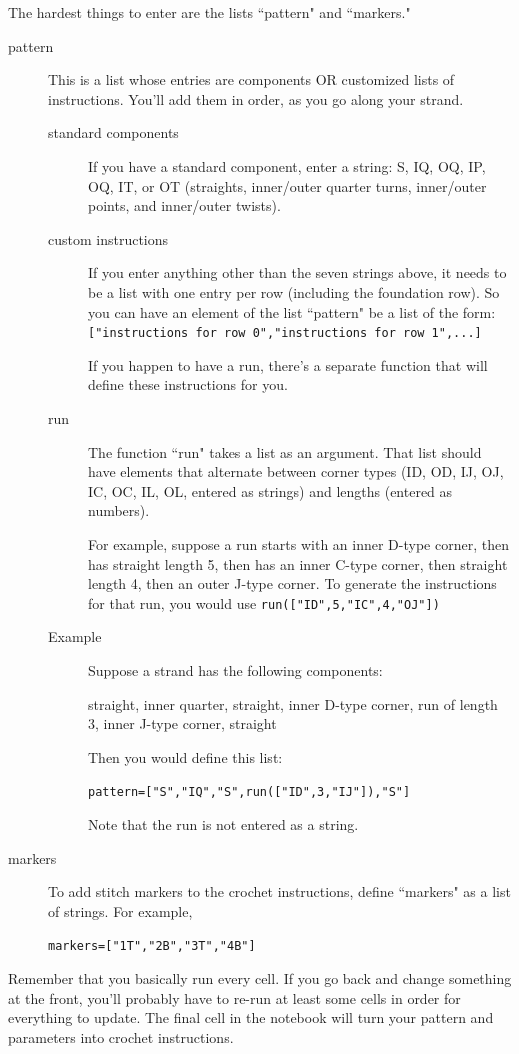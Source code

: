 \documentclass[openany]{book}
\begin{document}
The hardest things to enter are the lists ``pattern" and ``markers."
\begin{description}
\item[pattern] This is a list whose entries are components OR customized lists of instructions. You'll add them in order, as you go along your strand.
\begin{description}
\item[standard components]
If you have a standard component, enter a string: S, IQ, OQ, IP, OQ, IT, or OT (straights, inner/outer quarter turns, inner/outer points, and inner/outer twists).
\item[custom instructions] If you enter anything other than the seven strings above, it needs to be a list with one entry per row (including the foundation row). So you can have an element of the list ``pattern" be a list of the form: \texttt{["instructions for row 0","instructions for row 1",...]}

If you happen to have a run, there's a separate function that will define these instructions for you.
\item[run] The function ``run" takes a list as an argument. That list should have elements that alternate between corner types (ID, OD, IJ, OJ, IC, OC, IL, OL, entered as strings) and lengths (entered as numbers). 

For example, suppose a run starts with an inner D-type corner, then has straight length 5, then has an inner C-type corner, then straight length 4, then an outer J-type corner. To generate the instructions for that run, you would use \texttt{run(["ID",5,"IC",4,"OJ"])}
\item[Example]
Suppose a strand has the following components:
\begin{center}
straight, inner quarter, straight, inner D-type corner, run of length 3, inner J-type corner, straight
\end{center}
Then you would define this list:
\begin{center}
\texttt{pattern=["S","IQ","S",run(["ID",3,"IJ"]),"S"]}
\end{center}
Note that the run is not entered as a string.
\end{description}
\item[markers] To add stitch markers to the crochet instructions, define ``markers" as a list of strings. For example, \begin{center}\texttt{markers=["1T","2B","3T","4B"]}\end{center}

\end{description}
Remember that you basically run every cell. If you go back and change something at the front, you'll probably have to re-run at least some cells in order for everything to update. The final cell in the notebook will turn your pattern and parameters into crochet instructions. 
\end{document}
